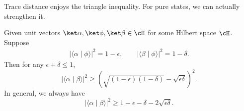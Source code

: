 Trace distance enjoys the triangle inequality. For pure states, we can actually strengthen it.

\begin{claim} \label{fact:overlap-triangle-ineq}
Given unit vectors $\ket\alpha, \ket\phi, \ket\beta \in \cH$ for some Hilbert space $\cH$. Suppose
    \begin{align*}
        |\langle \alpha \mid \phi \rangle|^2 = 1-\epsilon, \qquad
        |\langle \beta \mid \phi \rangle|^2 = 1-\delta. 
    \end{align*}
Then for any $\epsilon + \delta \le 1$,\footnotemark
    \begin{equation}      
    |\langle \alpha \mid \beta \rangle|^2 \ge 
    (
        \sqrt{(1-\epsilon)(1-\delta)}-\sqrt{\epsilon\delta}
    )^2.\label{eq:overlap-triangle-ineq-tight}
    \end{equation}
In general, we always have 
    \begin{equation}      
    |\langle \alpha \mid \beta \rangle|^2 \ge 1-\epsilon-\delta-2\sqrt{\epsilon\delta}. \label{eq:overlap-triangle-ineq-crude}
    \end{equation}
\end{claim}
